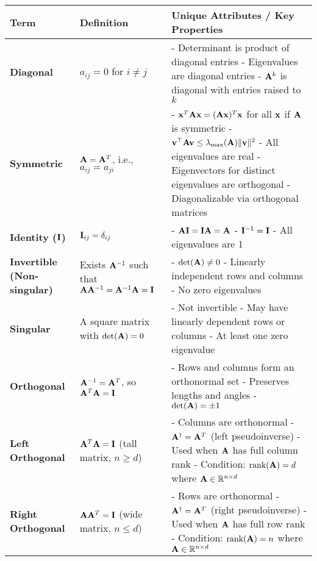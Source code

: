 \documentclass[12pt]{article}
\begin{document}
\begin{longtable}{|>{\bfseries}m{3.5cm}|m{5cm}|m{10.5cm}|}
		\hline
		\textbf{Term} & \textbf{Definition} & \textbf{Unique Attributes /
		Key Properties} \\
		\hline
		Diagonal & $a_{ij} = 0$ for $i \ne j$ &
		- Determinant is product of diagonal entries \newline
		- Eigenvalues are diagonal entries \newline
		- $\mathbf{A}^k$ is diagonal with entries raised to $k$ \\
		\hline
		Symmetric & $\mathbf{A} = \mathbf{A}^T$, i.e., $a_{ij} = a_{ji}$ &
		- $\mathbf{x}^T \mathbf{A} \mathbf{x} = (\mathbf{A} \mathbf{x})^T \mathbf{x}$ for all $\mathbf{x}$ if $\mathbf{A}$ is symmetric \newline
		- $\mathbf{v}^\top \mathbf{A} \mathbf{v} \leq \lambda_{\max}(\mathbf{A}) \|\mathbf{v}\|^2$ \newline
		- All eigenvalues are real \newline
		- Eigenvectors for distinct eigenvalues are orthogonal \newline
		- Diagonalizable via orthogonal matrices \\
		\hline
		Identity ($\mathbf{I}$) & $\mathbf{I}_{ij} = \delta_{ij}$ &
		- $\mathbf{A}\mathbf{I} = \mathbf{I}\mathbf{A} = \mathbf{A}$ \newline
		- $\mathbf{I}^{-1} = \mathbf{I}$ \newline
		- All eigenvalues are 1 \\
		\hline
		Invertible (Non-singular) & Exists $\mathbf{A}^{-1}$ such that $\mathbf{A}\mathbf{A}^{-1} =
		\mathbf{A}^{-1}\mathbf{A} = \mathbf{I}$ &
		- $\det(\mathbf{A}) \ne 0$ \newline
		- Linearly independent rows and columns \newline
		- No zero eigenvalues \\
		\hline
		Singular & A square matrix with $\det(\mathbf{A}) = 0$ &
		- Not invertible \newline
		- May have linearly dependent rows or columns \newline
		- At least one zero eigenvalue \\
		\hline
		Orthogonal & $\mathbf{A}^{-1} = \mathbf{A}^T$, so $\mathbf{A}^T \mathbf{A} = \mathbf{I}$ &
		- Rows and columns form an orthonormal set \newline
		- Preserves lengths and angles \newline
		- $\det(\mathbf{A}) = \pm 1$ \\
		\hline
		Left Orthogonal & $\mathbf{A}^T \mathbf{A} = \mathbf{I}$ (tall matrix, $n \geq d$) &
		- Columns are orthonormal \newline
		- $\mathbf{A}^\dagger = \mathbf{A}^T$ (left pseudoinverse) \newline
		- Used when $\mathbf{A}$ has full column rank \newline
		- Condition: $\text{rank}(\mathbf{A}) = d$ where $\mathbf{A} \in \mathbb{R}^{n \times d}$ \\
		\hline
		Right Orthogonal & $\mathbf{A} \mathbf{A}^T = \mathbf{I}$ (wide matrix, $n \leq d$) &
		- Rows are orthonormal \newline
		- $\mathbf{A}^\dagger = \mathbf{A}^T$ (right pseudoinverse) \newline
		- Used when $\mathbf{A}$ has full row rank \newline
		- Condition: $\text{rank}(\mathbf{A}) = n$ where $\mathbf{A} \in \mathbb{R}^{n \times d}$ \\


\end{longtable}
\end{document}
